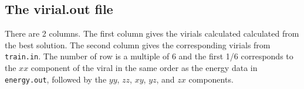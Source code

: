 \documentclass[12pt,a4paper]{report}
\begin{document}
\subsection{The virial.out file}

There are 2 columns. The first column gives the virials calculated calculated from the best solution. The second column gives the corresponding virials from \verb"train.in". The number of row is a multiple of 6 and the first 1/6 corresponds to the $xx$ component of the viral in the same order as the energy data in \verb"energy.out", followed by the $yy$, $zz$, $xy$, $yz$, and $zx$ components.




\end{document}
